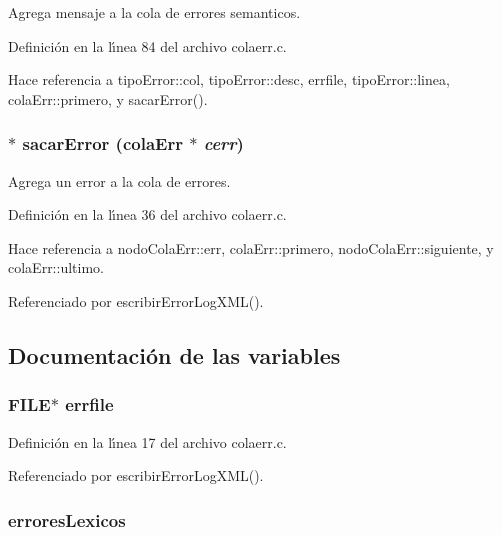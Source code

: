 Agrega mensaje a la cola de errores semanticos. 



Definici\'{o}n en la l\'{\i}nea 84 del archivo colaerr.c.

Hace referencia a tipo\-Error::col, tipo\-Error::desc, errfile, tipo\-Error::linea, cola\-Err::primero, y sacar\-Error().
\subsubsection{$\ast$ sacar\-Error ({\bf cola\-Err} $\ast$ {\em cerr})}\label{colaerr_8c_a8}


Agrega un error a la cola de errores. 



Definici\'{o}n en la l\'{\i}nea 36 del archivo colaerr.c.

Hace referencia a nodo\-Cola\-Err::err, cola\-Err::primero, nodo\-Cola\-Err::siguiente, y cola\-Err::ultimo.

Referenciado por escribir\-Error\-Log\-XML().

\subsection{Documentaci\'{o}n de las variables}
\subsubsection{\setlength{\rightskip}{0pt plus 5cm}FILE$\ast$ {\bf errfile}\hspace{0.3cm}{\tt  [static]}}\label{colaerr_8c_a3}




Definici\'{o}n en la l\'{\i}nea 17 del archivo colaerr.c.

Referenciado por escribir\-Error\-Log\-XML().
\subsubsection{ {\bf errores\-Lexicos}\hspace{0.3cm}{\tt  [static]}}\label{colaerr_8c_a0}




